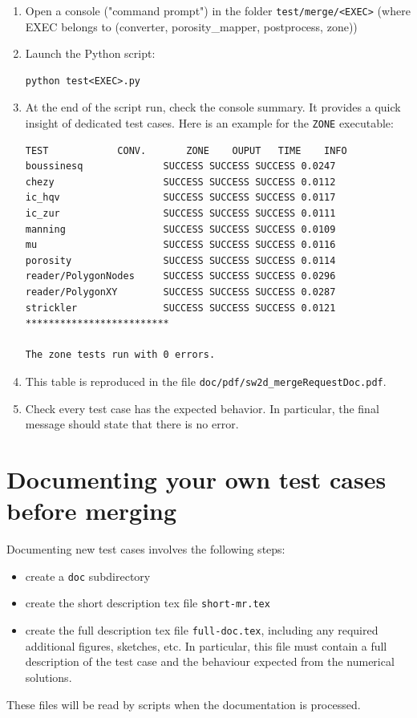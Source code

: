 \begin{enumerate}
\item Open a console ("command prompt") in the folder \texttt{test/merge/<EXEC>} (where EXEC belongs to (converter, porosity\_mapper, postprocess, zone))
\item Launch the Python script:
\begin{lstlisting}
python test<EXEC>.py
\end{lstlisting}
\item At the end of the script run, check the console summary. It provides a quick insight of dedicated test cases. 
Here is an example for the \texttt{ZONE} executable:
\begin{lstlisting}[basicstyle=\tiny]
        TEST        	CONV.	    ZONE	OUPUT	TIME	INFO
boussinesq          	SUCCESS	SUCCESS	SUCCESS	0.0247	
chezy               	SUCCESS	SUCCESS	SUCCESS	0.0112	
ic_hqv              	SUCCESS	SUCCESS	SUCCESS	0.0117	
ic_zur              	SUCCESS	SUCCESS	SUCCESS	0.0111	
manning             	SUCCESS	SUCCESS	SUCCESS	0.0109	
mu                  	SUCCESS	SUCCESS	SUCCESS	0.0116	
porosity            	SUCCESS	SUCCESS	SUCCESS	0.0114	
reader/PolygonNodes 	SUCCESS	SUCCESS	SUCCESS	0.0296	
reader/PolygonXY    	SUCCESS	SUCCESS	SUCCESS	0.0287	
strickler           	SUCCESS	SUCCESS	SUCCESS	0.0121	
*************************

The zone tests run with 0 errors.
\end{lstlisting}
\item This table is reproduced in the file \texttt{doc/pdf/sw2d\_mergeRequestDoc.pdf}.
\item Check every test case has the expected behavior. In particular, the final message should state that there is no error.
\end{enumerate}

\section{Documenting your own test cases before merging}
Documenting new test cases involves the following steps:
\begin{itemize}
    \item create a \texttt{doc} subdirectory 
    \item create the short description tex file \texttt{short-mr.tex} 
    \item create the full description tex file \texttt{full-doc.tex}, including any required additional figures, sketches, etc. 
    In particular, this file must contain a full description of the test case and the 
    behaviour expected from the numerical solutions.
\end{itemize}

These files will be read by scripts when the documentation is processed. 
